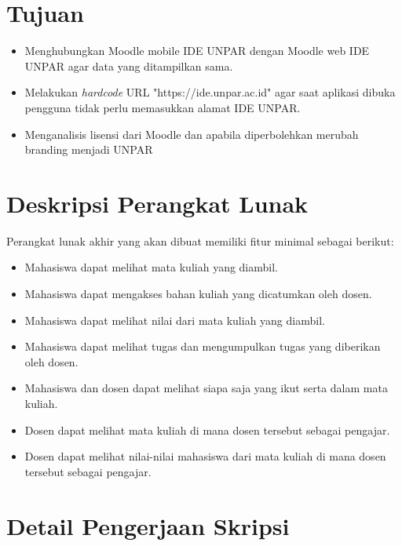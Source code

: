 \documentclass[a4paper,twoside]{article}
\begin{document}
\section{Tujuan}
\begin{itemize}
	\item Menghubungkan Moodle mobile IDE UNPAR dengan Moodle web IDE UNPAR agar data yang ditampilkan sama.
	\item Melakukan \textit{hardcode} URL "https://ide.unpar.ac.id" agar saat aplikasi dibuka pengguna tidak perlu memasukkan alamat IDE UNPAR.
	\item Menganalisis lisensi dari Moodle dan apabila diperbolehkan merubah branding menjadi UNPAR
\end{itemize}

\section{Deskripsi Perangkat Lunak}

Perangkat lunak akhir yang akan dibuat memiliki fitur minimal sebagai berikut:
\begin{itemize}
	\item Mahasiswa dapat melihat mata kuliah yang diambil.
	\item Mahasiswa dapat mengakses bahan kuliah yang dicatumkan oleh dosen.
	\item Mahasiswa dapat melihat nilai dari mata kuliah yang diambil. 
	\item Mahasiswa dapat melihat tugas dan mengumpulkan tugas yang diberikan oleh dosen.
	\item Mahasiswa dan dosen dapat melihat siapa saja yang ikut serta dalam mata kuliah.
	\item Dosen dapat melihat mata kuliah di mana dosen tersebut sebagai pengajar.
	\item Dosen dapat melihat nilai-nilai mahasiswa dari mata kuliah di mana dosen tersebut sebagai pengajar.
	
\end{itemize}

\section{Detail Pengerjaan Skripsi}
\end{document}

